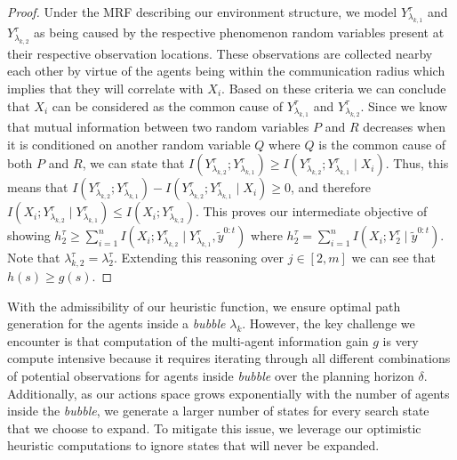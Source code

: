 \documentclass[letterpaper, 10 pt, conference]{IEEEConference}
\begin{document}
\begin{proof}
Under the MRF describing our environment structure, we model $Y_{\lambda_{k, 1}}^{\tau}$ and $Y_{\lambda_{k, 2}}^{\tau}$ as being caused by the respective phenomenon random variables present at their respective observation locations. These observations are collected nearby each other by virtue of the agents being within the communication radius which implies that they will correlate with $X_i$. Based on these criteria we can conclude that $X_i$ can be considered as the common cause of $Y_{\lambda_{k, 1}}^{\tau}$ and $Y_{\lambda_{k, 2}}^{\tau}$. Since we know that mutual information between two random variables $P$ and $R$ decreases when it is conditioned on another random variable $Q$ where $Q$ is the common cause of both $P$ and $R$, we can state that $I(Y_{\lambda_{k, 2}}^{\tau}; Y_{\lambda_{k, 1}}^{\tau}) \geq I(Y_{\lambda_{k, 2}}^{\tau} ; Y_{\lambda_{k, 1}}^{\tau} \mid X_i)$. Thus, this means that $I(Y_{\lambda_{k, 2}}^{\tau}; Y_{\lambda_{k, 1}}^{\tau}) - I(Y_{\lambda_{k, 2}}^{\tau}; Y_{\lambda_{k, 1}}^{\tau} \mid X_i) \geq 0$, and therefore $I(X_i; Y_{\lambda_{k, 2}}^{\tau} \mid Y_{\lambda_{k, 1}}^{\tau}) \leq I(X_i; Y_{\lambda_{k, 2}}^{\tau})$. This proves our intermediate objective of showing $h_2^{\tau} \geq \sum_{i=1}^n I(X_i; Y_{\lambda_{k, 2}}^{\tau} \mid Y_{\lambda_{k, 1}}^{\tau}, \tilde{y}^{0:t})$ where $h_2^{\tau} = \sum_{i=1}^n I(X_i ; Y_2^{\tau} \mid \tilde{y}^{0:t})$. Note that $\lambda_{k, 2}^{\tau} = \lambda_2^{\tau}$. Extending this reasoning over $j \in [2, m]$ we can see that $h(s) \geq g(s)$.
\end{proof}

With the admissibility of our heuristic function, we ensure optimal path generation for the agents inside a \textit{bubble} $\lambda_k$. However, the key challenge we encounter is that computation of the multi-agent information gain $g$ is very compute intensive because it requires iterating through all different combinations of potential observations for agents inside \textit{bubble} over the planning horizon $\delta$. Additionally, as our actions space grows exponentially with the number of agents inside the \textit{bubble}, we generate a larger number of states for every search state that we choose to expand. To mitigate this issue, we leverage our optimistic heuristic computations to ignore states that will never be expanded. 
\end{document}
